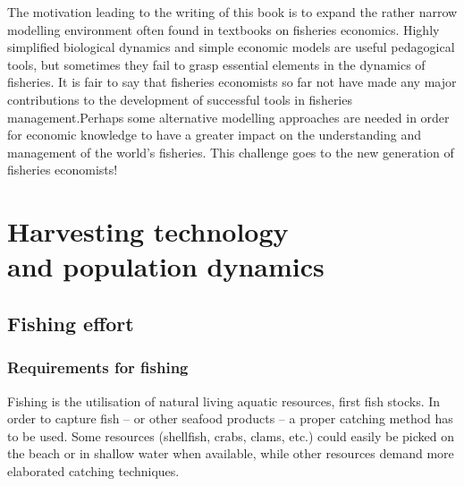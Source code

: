 \documentclass[11pt,fleqn]{book} %
\begin{document}
The motivation leading to the writing of this book is to expand the rather narrow modelling environment often found in textbooks on fisheries economics. Highly simplified biological dynamics and simple economic models are useful pedagogical tools, but sometimes they fail to grasp essential elements in the dynamics of fisheries. It is fair to say that fisheries economists so far not have made any major contributions to the development of successful tools in fisheries management\cite{Wilen2000}.Perhaps some alternative modelling approaches are needed in order for economic knowledge to have a greater impact on the understanding and management of the world's fisheries. This challenge goes to the new generation of fisheries economists!

\part[Harvesting technology and population dynamics]{\texorpdfstring{Harvesting technology \\ and population dynamics}{Harvesting technology and population dynamics}}

\chapter{Fishing effort}  \label{chapter 2}
\section{Requirements for fishing} \label{requirements}

Fishing is the utilisation of natural living aquatic resources, first fish stocks. In order to capture fish -- or other seafood products -- a proper catching method has to be used. Some resources (shellfish, crabs, clams, etc.) could easily be picked on the beach or in shallow water when available, while other resources demand more elaborated catching techniques.
\end{document}
